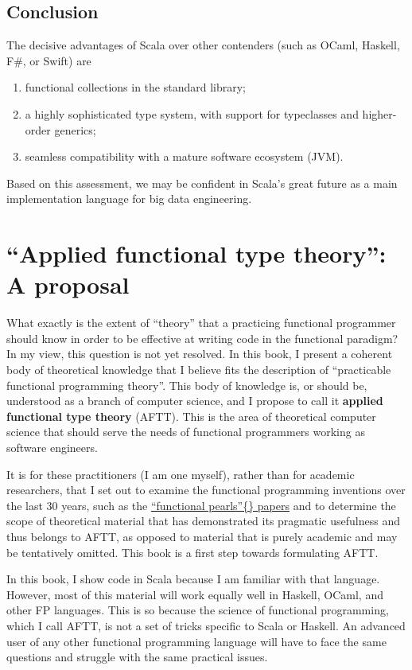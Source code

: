 \section{Conclusion}

The decisive advantages of Scala over other contenders (such as OCaml,
Haskell, F\#, or Swift) are
\begin{enumerate}
\item functional collections in the standard library;
\item a highly sophisticated type system, with support for typeclasses and
higher-order generics; 
\item seamless compatibility with a mature software ecosystem (JVM). 
\end{enumerate}
Based on this assessment, we may be confident in Scala's great future
as a main implementation language for big data engineering. 

\chapter{``Applied functional type theory'': A proposal}

What exactly is the extent of ``theory'' that a practicing functional
programmer should know in order to be effective at writing code in
the functional paradigm? In my view, this question is not yet resolved.
In this book, I present a coherent body of theoretical knowledge that
I believe fits the description of ``practicable functional programming
theory''. This body of knowledge is, or should be, understood as
a branch of computer science, and I propose to call it\textbf{ applied
functional type theory} (AFTT). This is the area of theoretical computer
science that should serve the needs of functional programmers working
as software engineers.

It is for these practitioners (I am one myself), rather than for academic
researchers, that I set out to examine the functional programming
inventions over the last 30 years, \textendash{} such as the \href{https://wiki.haskell.org/Research_papers/Functional_pearls}{\textquotedblleft functional pearls\textquotedblright\{\} papers}
\textendash{} and to determine the scope of theoretical material that
has demonstrated its pragmatic usefulness and thus belongs to AFTT,
as opposed to material that is purely academic and may be tentatively
omitted. This book is a first step towards formulating AFTT.

In this book, I show code in Scala because I am familiar with that
language. However, most of this material will work equally well in
Haskell, OCaml, and other FP languages. This is so because the science
of functional programming, which I call AFTT, is not a set of tricks
specific to Scala or Haskell. An advanced user of any other functional
programming language will have to face the same questions and struggle
with the same practical issues.

